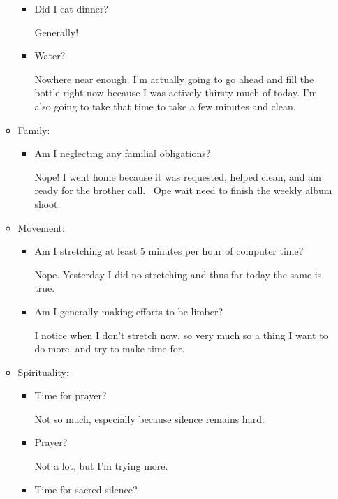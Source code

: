 \documentclass[12pt]{article}
\renewcommand{\,}{\textsuperscript{,}}
\begin{document}
\begin{enumerate}
\begin{itemize}
\begin{itemize}
\item Did I eat dinner?

Generally!

\item Water?

Nowhere near enough. I'm actually going to go ahead and fill the bottle right now because I was actively thirsty much of today.  
I'm also going to take that time to take a few minutes and clean.

\end{itemize}

\item Family:

\begin{itemize}

\item Am I neglecting any familial obligations?

Nope! I went home because it was requested, helped clean, and am ready for the brother call.   
Ope wait need to finish the weekly album shoot.

\end{itemize}

\item Movement:

\begin{itemize}

\item Am I stretching at least 5 minutes per hour of computer time?

Nope. Yesterday I did no stretching and thus far today the same is true.

\item Am I generally making efforts to be limber?

I notice when I don't stretch now, so very much so a thing I want to do more, and try to make time for.

\end{itemize}

\item Spirituality:

\begin{itemize}

\item Time for prayer?

Not so much, especially because silence remains hard.

\item Prayer?

Not a lot, but I'm trying more.

\item Time for sacred silence?


\end{itemize}
\end{itemize}
\end{enumerate}
\end{document}
